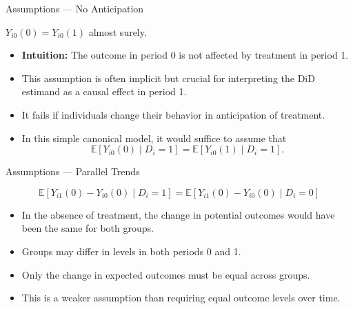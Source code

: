 \documentclass[11pt,aspectratio=169]{beamer}
\newcommand{\E}{\mathbb{E}}
\begin{document}
\begin{frame}{Assumptions --- No Anticipation}
\begin{definitionbox}[No Anticipation]
$Y_{i0}(0)=Y_{i0}(1)$ almost surely.
\end{definitionbox}
\begin{itemize}
  \item \textbf{Intuition:} The outcome in period 0 is not affected by treatment in period 1.
  \item This assumption is often implicit but crucial for interpreting the DiD estimand as a causal effect in period 1.
  \item It fails if individuals change their behavior in anticipation of treatment.
  \item In this simple canonical model, it would suffice to assume that
  \[\E[Y_{i0}(0)\mid D_i=1]=\E[Y_{i0}(1)\mid D_i=1].\]
\end{itemize}
\end{frame}

\begin{frame}{Assumptions --- Parallel Trends}
\begin{definitionbox}
\[\E[Y_{i1}(0)-Y_{i0}(0)\mid D_i=1]=\E[Y_{i1}(0)-Y_{i0}(0)\mid D_i=0]\]
\end{definitionbox}
\begin{itemize}
  \item In the absence of treatment, the change in potential outcomes would have been the same for both groups.
  \item Groups may differ in levels in both periods 0 and 1.
  \item Only the change in expected outcomes must be equal across groups.
  \item This is a weaker assumption than requiring equal outcome levels over time.
\end{itemize}
\end{frame}
\end{document}
